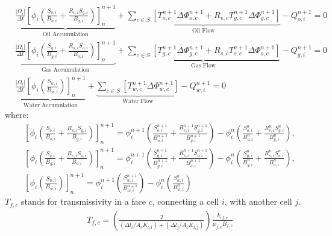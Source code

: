 \documentclass[review]{elsarticle}
\begin{document}
\begin{align}
\label{ec:aceiteDiscretizacion}&\underbrace{\frac{|\Omega_{i}|}{\Delta t}\left[ \phi_{i} \left( \frac{S_{o,i}}{B_{o,i}} + \frac{R_{v,i}S_{g,i}}{B_{g,i}}\right)\right]^{n+1}_{n}}_{\text{Oil Accumulation}} + 
\underbrace{\sum_{c \in S}\left[ T^{n+1}_{o,c} \Delta{\Phi_{o,c}^{n+1}} + R_{v,c}T^{n+1}_{g,c} \Delta{\Phi_{g,c}^{n+1}} \right] }_{\text{Oil Flow}} - Q_{o,i}^{n+1} = 0 \\
\label{ec:gasDiscretizacion}&\underbrace{\frac{|\Omega_{i}|}{\Delta t}\left[ \phi_{i} \left( \frac{S_{g,i}}{B_{g,i}} + \frac{R_{s,i}S_{o,i}}{B_{o,i}}\right)\right]^{n+1}_{n}}_{\text{Gas Accumulation}} + 
\underbrace{\sum_{c \in S}\left[ T^{n+1}_{g,c}\Delta{\Phi_{g,c}^{n+1} + R_{s,c}T^{n+1}_{o,c} \Delta{\Phi_{o,c}^{n+1}}} \right] }_{\text{Gas Flow}} - Q_{g,i}^{n+1} = 0 \\
\label{ec:aguaDiscretizacion}&\underbrace{\frac{|\Omega_{i}|}{\Delta t}\left[ \phi_{i} \left( \frac{S_{w,i}}{B_{w,i}}\right)\right]^{n+1}_{n}}_{\text{Water Accumulation}}
+ 
\underbrace{\sum_{c \in S}\left[ T^{n+1}_{w,c}\Delta{\Phi_{w,c}^{n+1}} \right]}_{\text{Water Flow}} - Q_{w,i}^{n+1} = 0 
\end{align}
where:
\begin{align*}
&\left[ \phi_{i} \left( \frac{S_{o,i}}{B_{o,i}} + \frac{R_{v,i}S_{g,i}}{B_{g,i}}\right)\right]^{n+1}_{n} = 
\phi^{n+1}_{i} \left( \frac{S_{o,i}^{n+1}}{B_{o,i}^{n+1}} + \frac{R_{v,i}^{n+1}S_{g,i}^{n+1}}{B_{g,i}^{n+1}}\right) - \phi^{n}_{i} \left( \frac{S_{o,i}^{n}}{B_{o,i}^{n}} + \frac{R_{v,i}^{n}S_{g,i}^{n}}{B_{g,i}^{n}}\right),\\
&\left[ \phi_{i} \left( \frac{S_{g,i}}{B_{g,i}} + \frac{R_{s,i}S_{o,i}}{B_{o,i}}\right)\right]^{n+1}_{n} = 
\phi^{n+1}_{i} \left( \frac{S_{g,i}^{n+1}}{B_{g,i}^{n+1}} + \frac{R_{s,i}^{n+1}S_{o,i}^{n+1}}{B_{o,i}^{n+1}}\right) - \phi^{n}_{i} \left( \frac{S_{g,i}^{n}}{B_{g,i}^{n}} + \frac{R_{s,i}^{n}S_{o,i}^{n}}{B_{o,i}^{n}}\right),\\
&\left[ \phi_{i} \left( \frac{S_{w,i}}{B_{w,i}}\right)\right]^{n+1}_{n} = 
\phi^{n+1}_{i} \left( \frac{S_{w,i}^{n+1}}{B_{w,i}^{n+1}}\right) - \phi^{n}_{i} \left( \frac{S_{w,i}^{n}}{B_{w,i}^{n}}\right)
\end{align*}
$T_{f,c}$ stands for transmissivity in a face $c$, connecting a cell $i$, with another cell $j$.
\begin{align}
\label{ec:Transmissibity}& T_{f,c} = \left(\frac{2}{(\Delta l_{i}/A_{c}K_{l,i})+(\Delta l_{j}/A_{c}K_{l,j})}\right)\frac{k_{rf,c}}{\mu_{f,c}B_{f,c}}
\end{align}
\end{document}
